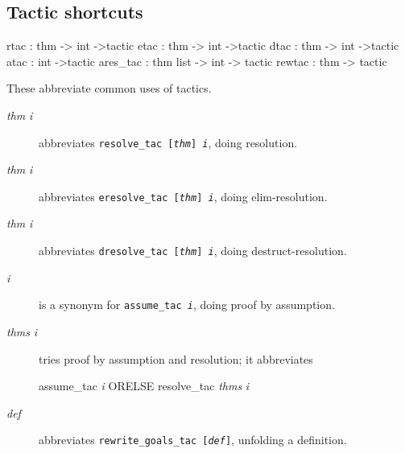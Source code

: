 \subsection{Tactic shortcuts}
\begin{ttbox} 
rtac     : thm -> int ->tactic
etac     : thm -> int ->tactic
dtac     : thm -> int ->tactic
atac     : int ->tactic
ares_tac : thm list -> int -> tactic
rewtac   : thm -> tactic
\end{ttbox}
These abbreviate common uses of tactics.
\begin{description}
\item[ {\it thm} {\it i}] 
abbreviates \hbox{\tt resolve_tac [{\it thm}] {\it i}}, doing resolution.

\item[ {\it thm} {\it i}] 
abbreviates \hbox{\tt eresolve_tac [{\it thm}] {\it i}}, doing elim-resolution.

\item[ {\it thm} {\it i}] 
abbreviates \hbox{\tt dresolve_tac [{\it thm}] {\it i}}, doing
destruct-resolution.

\item[ {\it i}] 
is a synonym for \hbox{\tt assume_tac {\it i}}, doing proof by assumption.

\item[ {\it thms} {\it i}] 
tries proof by assumption and resolution; it abbreviates
\begin{ttbox}
assume_tac {\it i} ORELSE resolve_tac {\it thms} {\it i}
\end{ttbox}

\item[ {\it def}] 
abbreviates \hbox{\tt rewrite_goals_tac [{\it def}]}, unfolding a definition.
\end{description}


